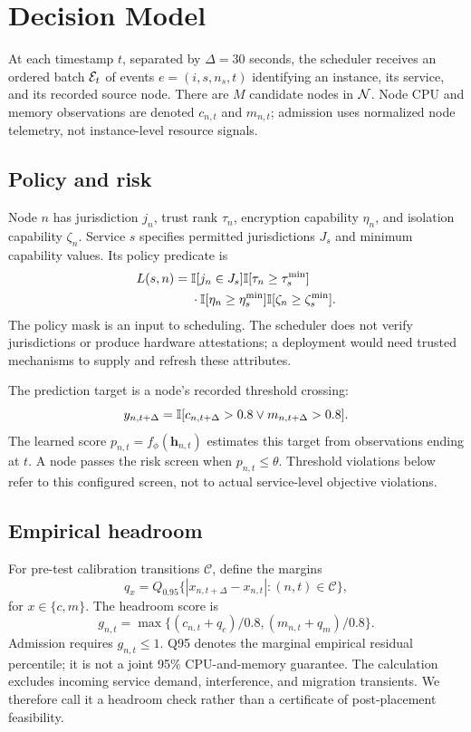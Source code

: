 \section{Decision Model}\label{sec:model}
At each timestamp $t$, separated by $\Delta=30$ seconds, the scheduler
receives an ordered batch $\mathcal{E}_t$ of events $e=(i,s,n_s,t)$ identifying
an instance, its service, and its recorded source node. There are $M$
candidate nodes in $\mathcal{N}$. Node CPU and memory observations are denoted
$c_{n,t}$ and $m_{n,t}$; admission uses normalized node telemetry, not
instance-level resource signals.

\subsection{Policy and risk}
Node $n$ has jurisdiction $j_n$, trust rank $\tau_n$, encryption capability
$\eta_n$, and isolation capability $\zeta_n$. Service $s$ specifies
permitted jurisdictions $J_s$ and minimum capability values. Its policy
predicate is
\begin{equation}\label{eq:legal}
\begin{split}
L(s,n)={}&\mathbb{I}[j_n\in J_s]\mathbb{I}[\tau_n\geq\tau_s^{\min}]\\
&\cdot\mathbb{I}[\eta_n\geq\eta_s^{\min}]
\mathbb{I}[\zeta_n\geq\zeta_s^{\min}].
\end{split}
\end{equation}
The policy mask is an input to scheduling. The scheduler does not verify
jurisdictions or produce hardware attestations; a deployment would need
trusted mechanisms to supply and refresh these attributes.

The prediction target is a node's recorded threshold crossing:
\begin{equation}\label{eq:unsafe}
y_{n,t+\Delta}=\mathbb{I}[c_{n,t+\Delta}>0.8\lor m_{n,t+\Delta}>0.8].
\end{equation}
The learned score $p_{n,t}=f_{\phi}(\mathbf h_{n,t})$ estimates this target
from observations ending at $t$. A node passes the risk screen when
$p_{n,t}\leq\theta$. Threshold violations below refer to this configured
screen, not to actual service-level objective violations.

\subsection{Empirical headroom}
For pre-test calibration transitions $\mathcal C$, define the margins
\begin{equation}
q_x=Q_{0.95}\{|x_{n,t+\Delta}-x_{n,t}|:(n,t)\in\mathcal C\},
\end{equation}
for $x\in\{c,m\}$. The headroom score is
\begin{equation}\label{eq:guardrail}
g_{n,t}=\max\{(c_{n,t}+q_c)/0.8,(m_{n,t}+q_m)/0.8\}.
\end{equation}
Admission requires $g_{n,t}\leq1$. Q95 denotes the marginal empirical
residual percentile; it is not a joint 95\% CPU-and-memory guarantee.
The calculation excludes incoming service demand, interference, and
migration transients. We therefore call it a headroom check rather than
a certificate of post-placement feasibility.


